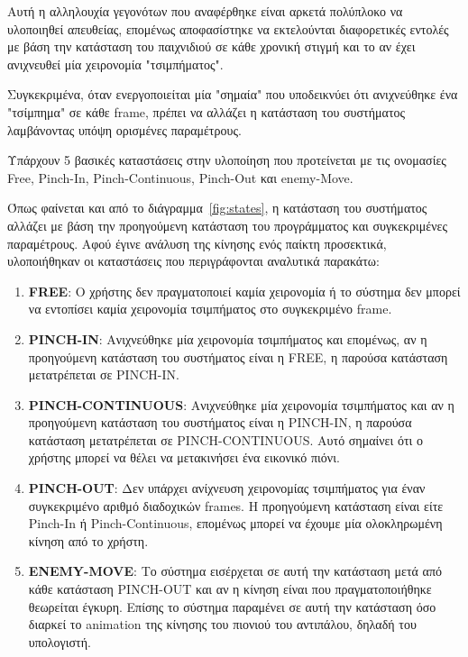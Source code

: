 Αυτή η αλληλουχία γεγονότων που αναφέρθηκε είναι αρκετά πολύπλοκο να υλοποιηθεί απευθείας, επομένως αποφασίστηκε να εκτελούνται διαφορετικές εντολές με βάση την κατάσταση του παιχνιδιού σε κάθε χρονική στιγμή και το αν έχει ανιχνευθεί μία χειρονομία "τσιμπήματος".

Συγκεκριμένα, όταν ενεργοποιείται μία "σημαία" που υποδεικνύει ότι ανιχνεύθηκε ένα "τσίμπημα" σε κάθε frame, πρέπει να αλλάζει η κατάσταση του συστήματος λαμβάνοντας υπόψη ορισμένες παραμέτρους.

Υπάρχουν 5 βασικές καταστάσεις στην υλοποίηση που προτείνεται με τις ονομασίες Free, Pinch-In, Pinch-Continuous, Pinch-Out και enemy-Move. 

Όπως φαίνεται και από το διάγραμμα~\ref{fig:states}, η κατάσταση του συστήματος αλλάζει με βάση την προηγούμενη κατάσταση του προγράμματος και συγκεκριμένες παραμέτρους. Αφού έγινε ανάλυση της κίνησης ενός παίκτη προσεκτικά, υλοποιήθηκαν οι καταστάσεις που περιγράφονται αναλυτικά παρακάτω:

\begin{enumerate}
\item \textbf{FREE}: Ο χρήστης δεν πραγματοποιεί καμία χειρονομία ή το σύστημα δεν μπορεί να εντοπίσει καμία χειρονομία τσιμπήματος στο συγκεκριμένο frame.

\item \textbf{PINCH-IN}: Ανιχνεύθηκε μία χειρονομία τσιμπήματος και επομένως, αν η προηγούμενη κατάσταση του συστήματος είναι η FREE, η παρούσα κατάσταση μετατρέπεται σε PINCH-IN.


\item \textbf{PINCH-CONTINUOUS}: Ανιχνεύθηκε μία χειρονομία τσιμπήματος και αν η προηγούμενη κατάσταση του συστήματος είναι η PINCH-IN, η παρούσα κατάσταση μετατρέπεται σε PINCH-CONTINUOUS. Αυτό σημαίνει ότι ο χρήστης μπορεί να θέλει να μετακινήσει ένα εικονικό πιόνι. 

\item \textbf{PINCH-OUT}: Δεν υπάρχει ανίχνευση χειρονομίας τσιμπήματος για έναν συγκεκριμένο αριθμό διαδοχικών frames. Η προηγούμενη κατάσταση είναι είτε Pinch-In ή Pinch-Continuous, επομένως μπορεί να έχουμε μία ολοκληρωμένη κίνηση από το χρήστη. 


\item \textbf{ENEMY-MOVE}: Το σύστημα εισέρχεται σε αυτή την κατάσταση μετά από κάθε κατάσταση PINCH-OUT και αν η κίνηση είναι που πραγματοποιήθηκε θεωρείται έγκυρη. Επίσης το σύστημα παραμένει σε αυτή την κατάσταση όσο διαρκεί το animation της κίνησης του πιονιού του αντιπάλου, δηλαδή του υπολογιστή. 
\end{enumerate}




